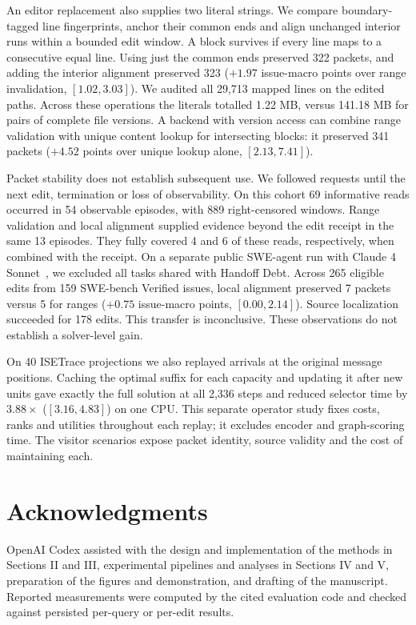 \documentclass[conference]{IEEEtran}
\begin{document}
An editor replacement also supplies two literal strings. We compare boundary-tagged line fingerprints, anchor their common ends and align unchanged interior runs within a bounded edit window. A block survives if every line maps to a consecutive equal line. Using just the common ends preserved 322 packets, and adding the interior alignment preserved 323 ($+1.97$ issue-macro points over range invalidation, $[1.02,3.03]$). We audited all 29,713 mapped lines on the edited paths. Across these operations the literals totalled 1.22 MB, versus 141.18 MB for pairs of complete file versions. A backend with version access can combine range validation with unique content lookup for intersecting blocks: it preserved 341 packets ($+4.52$ points over unique lookup alone, $[2.13,7.41]$).

Packet stability does not establish subsequent use. We followed requests until the next edit, termination or loss of observability. On this cohort 69 informative reads occurred in 54 observable episodes, with 889 right-censored windows. Range validation and local alignment supplied evidence beyond the edit receipt in the same 13 episodes. They fully covered 4 and 6 of these reads, respectively, when combined with the receipt. On a separate public SWE-agent run with Claude 4 Sonnet~\cite{swe-run}, we excluded all tasks shared with Handoff Debt. Across 265 eligible edits from 159 SWE-bench Verified issues, local alignment preserved 7 packets versus 5 for ranges ($+0.75$ issue-macro points, $[0.00,2.14]$). Source localization succeeded for 178 edits. This transfer is inconclusive. These observations do not establish a solver-level gain.

On 40 ISETrace projections we also replayed arrivals at the original message positions. Caching the optimal suffix for each capacity and updating it after new units gave exactly the full solution at all 2,336 steps and reduced selector time by $3.88\times$ ($[3.16,4.83]$) on one CPU. This separate operator study fixes costs, ranks and utilities throughout each replay; it excludes encoder and graph-scoring time. The visitor scenarios expose packet identity, source validity and the cost of maintaining each.

\section*{Acknowledgments}
OpenAI Codex assisted with the design and implementation of the methods in Sections II and III, experimental pipelines and analyses in Sections IV and V, preparation of the figures and demonstration, and drafting of the manuscript. Reported measurements were computed by the cited evaluation code and checked against persisted per-query or per-edit results.



\end{document}
